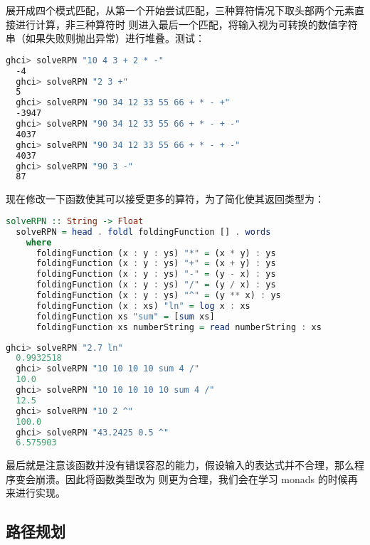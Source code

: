 \documentclass[./main.tex]{subfiles}
\begin{document}
展开成四个模式匹配，从第一个开始尝试匹配，三种算符情况下取头部两个元素直接进行计算，非三种算符时
则进入最后一个匹配，将输入视为可转换的数值字符串（如果失败则抛出异常）进行堆叠。测试：

\begin{lstlisting}[language=Bash]
  ghci> solveRPN "10 4 3 + 2 * -"
  -4
  ghci> solveRPN "2 3 +"
  5
  ghci> solveRPN "90 34 12 33 55 66 + * - +"
  -3947
  ghci> solveRPN "90 34 12 33 55 66 + * - + -"
  4037
  ghci> solveRPN "90 34 12 33 55 66 + * - + -"
  4037
  ghci> solveRPN "90 3 -"
  87
\end{lstlisting}

现在修改一下函数使其可以接受更多的算符，为了简化使其返回类型为：

\begin{lstlisting}[language=Haskell]
  solveRPN :: String -> Float
  solveRPN = head . foldl foldingFunction [] . words
    where
      foldingFunction (x : y : ys) "*" = (x * y) : ys
      foldingFunction (x : y : ys) "+" = (x + y) : ys
      foldingFunction (x : y : ys) "-" = (y - x) : ys
      foldingFunction (x : y : ys) "/" = (y / x) : ys
      foldingFunction (x : y : ys) "^" = (y ** x) : ys
      foldingFunction (x : xs) "ln" = log x : xs
      foldingFunction xs "sum" = [sum xs]
      foldingFunction xs numberString = read numberString : xs
\end{lstlisting}

\begin{lstlisting}[language=Haskell]
  ghci> solveRPN "2.7 ln"
  0.9932518
  ghci> solveRPN "10 10 10 10 sum 4 /"
  10.0
  ghci> solveRPN "10 10 10 10 10 sum 4 /"
  12.5
  ghci> solveRPN "10 2 ^"
  100.0
  ghci> solveRPN "43.2425 0.5 ^"
  6.575903
\end{lstlisting}

最后就是注意该函数并没有错误容忍的能力，假设输入的表达式并不合理，那么程序变会崩溃。因此将函数类型改为
则更为合理，我们会在学习 monads 的时候再来进行实现。

\subsection*{路径规划}

\end{document}
